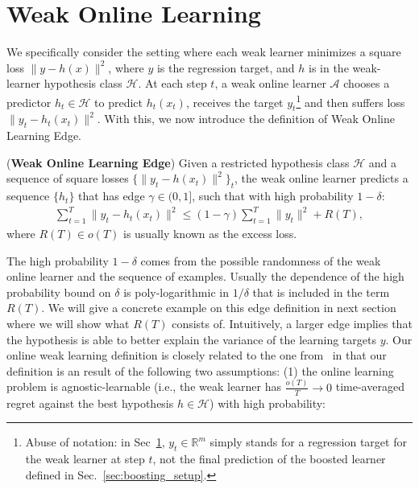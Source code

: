 \section{Weak Online Learning}
\label{sec:weak_learn}
We specifically consider the setting where each weak learner minimizes a square loss \mbox{$\|y - h(x)\|^2$}, where  $y$ is the regression target, and $h$ is in the weak-learner hypothesis class $\mathcal{H}$.
At each step $t$, a weak online learner $\mathcal{A}$ chooses a predictor $h_t \in \mathcal{H}$ to predict $h_t(x_t)$, receives the target $y_t$\footnote{Abuse of notation: in Sec~\ref{sec:weak_learn}, $y_t\in\mathbb{R}^m$ simply stands for a regression target for the weak learner at step $t$, not the final prediction of the boosted learner defined in Sec.~\ref{sec:boosting_setup}.} and then suffers loss $\|y_t - h_t(x_t)\|^2$. With this, we now introduce the definition of Weak Online Learning Edge.
\begin{definition}
\label{def:weak_learning}(\textbf{Weak Online Learning Edge}) Given a restricted hypothesis class $\mathcal{H}$ and a sequence of square losses $\{\|y_t - h(x_t)\|^2\}_t$, the weak online learner predicts a sequence $\{h_t\}$ that has edge $\gamma \in (0,1]$, such that with high probability $1-\delta$:
\begin{align}
\label{eq:weak_learner_eq}
\sum_{t=1}^T \|y_t - h_t(x_t)\|^2\leq (1-\gamma)\sum_{t=1}^T \|y_t\|^2 + R(T),
\end{align} where $R(T)\in o(T)$ is usually known as the excess loss. 
\end{definition} The high probability $1-\delta$ comes from the possible randomness of the weak online learner and the sequence of examples. Usually the dependence of the high probability bound on $\delta$ is poly-logarithmic in $1/\delta$ that is included in the term $R(T)$. We will give a concrete example on this edge definition in next section where we will show what $R(T)$ consists of.  Intuitively, a larger edge implies that the hypothesis is able to better explain the variance of the learning targets $y$. Our online weak learning definition is closely related to the one from~\citep{beygelzimer2015optimal} in that our definition is an result of the following two assumptions: (1) the online learning problem is agnostic-learnable (i.e., the weak learner has $\frac{o(T)}{T} \rightarrow 0$ time-averaged regret against the best hypothesis $h \in \mathcal{H}$) with high probability:
